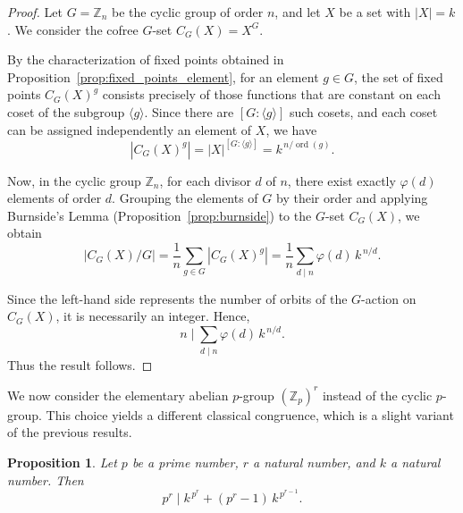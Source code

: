 \documentclass{amsart}
\newtheorem{proposition}{Proposition}
\begin{document}
\begin{proof}
Let $G = \mathbb{Z}_n$ be the cyclic group of order $n$, and let $X$ be a set with $|X| = k$. We consider the cofree $G$-set $C_G(X) = X^G$.

By the characterization of fixed points obtained in Proposition~\ref{prop:fixed_points_element}, for an element $g \in G$, the set of fixed points $C_G(X)^g$ consists precisely of those functions that are constant on each coset of the subgroup $\langle g \rangle$. Since there are $[G : \langle g \rangle]$ such cosets, and each coset can be assigned independently an element of $X$, we have
\[
\left\lvert C_G(X)^g \right\rvert = |X|^{[G : \langle g \rangle]} = k^{\, n / \operatorname{ord}(g)}.
\]

Now, in the cyclic group $\mathbb{Z}_n$, for each divisor $d$ of $n$, there exist exactly $\varphi(d)$ elements of order $d$. Grouping the elements of $G$ by their order and applying Burnside's Lemma (Proposition~\ref{prop:burnside}) to the $G$-set $C_G(X)$, we obtain
\[
\left\lvert C_G(X) / G \right\rvert
= \frac{1}{n} \sum_{g \in G} \left\lvert C_G(X)^g \right\rvert
= \frac{1}{n} \sum_{d \mid n} \varphi(d)\, k^{\, n/d}.
\]

Since the left-hand side represents the number of orbits of the $G$-action on $C_G(X)$, it is necessarily an integer. Hence,
\[
n \mid \sum_{d \mid n} \varphi(d)\, k^{\, n/d}.
\]
Thus the result follows.
\end{proof}

We now consider the elementary abelian $p$-group $(\mathbb{Z}_p)^r$ instead of the cyclic $p$-group. This choice yields a different classical congruence, which is a slight variant of the previous results.

\begin{proposition}\label{prop:fermat_elementary_abelian}
Let $p$ be a prime number, $r$ a natural number, and $k$ a natural number. Then
\[
p^r \mid k^{\,p^r} + (p^r - 1)\, k^{\,p^{r-1}}.
\]
\end{proposition}
\end{document}
